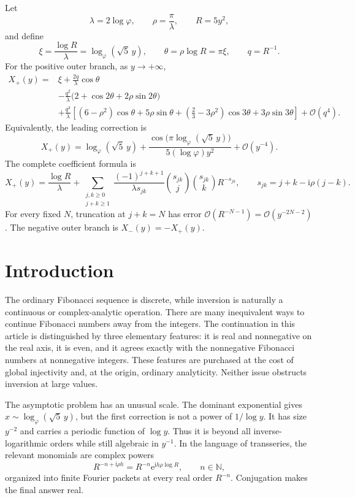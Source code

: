 \documentclass[11pt,oneside]{article}
\numberwithin{equation}{section}
\theoremstyle{plain}
\theoremstyle{definition}
\theoremstyle{remark}
\newcommand{\e}{\mathrm e}
\newcommand{\ii}{\mathrm i}
\newcommand{\Ord}{\mathcal O}
\begin{document}
\begin{mainresultbox}
Let
\[
 \lambda=2\log\varphi,\qquad \rho=\frac{\pi}{\lambda},\qquad
 R=5y^2,
\]
and define
\[
 \xi=\frac{\log R}{\lambda}=\log_{\varphi}(\sqrt5\,y),
 \qquad \theta=\rho\log R=\pi\xi,
 \qquad q=R^{-1}.
\]
For the positive outer branch, as \(y\to+\infty\),
\begin{align*}
 X_+(y)={}&\xi+\frac{2q}{\lambda}\cos\theta\\
 &-\frac{q^2}{\lambda}
   \bigl(2+\cos2\theta+2\rho\sin2\theta\bigr)\\
 &+\frac{q^3}{\lambda}
 \left[
   (6-\rho^2)\cos\theta+5\rho\sin\theta
   +\left(\frac23-3\rho^2\right)\cos3\theta
   +3\rho\sin3\theta
 \right]
 +\Ord(q^4).
\end{align*}
Equivalently, the leading correction is
\[
 X_+(y)=\log_{\varphi}(\sqrt5\,y)
 +\frac{\cos\!\bigl(\pi\log_{\varphi}(\sqrt5\,y)\bigr)}
 {5(\log\varphi)y^2}
 +\Ord(y^{-4}).
\]
The complete coefficient formula is
\[
 X_+(y)=\frac{\log R}{\lambda}
 +\sum_{\substack{j,k\ge0\\j+k\ge1}}
 \frac{(-1)^{j+k+1}}{\lambda s_{jk}}
 \binom{s_{jk}}j\binom{s_{jk}}k R^{-s_{jk}},
 \qquad s_{jk}=j+k-\ii\rho(j-k).
\]
For every fixed \(N\), truncation at \(j+k=N\) has error
\(\Ord(R^{-N-1})=\Ord(y^{-2N-2})\).  The negative outer branch is
\(X_-(y)=-X_+(y)\).
\end{mainresultbox}

\tableofcontents
\newpage
\section{Introduction}

The ordinary Fibonacci sequence is discrete, while inversion is naturally a
continuous or complex-analytic operation.  There are many inequivalent ways
to continue Fibonacci numbers away from the integers.  The continuation in
this article is distinguished by three elementary features: it is real and
nonnegative on the real axis, it is even, and it agrees exactly with the
nonnegative Fibonacci numbers at nonnegative integers.  These features are
purchased at the cost of global injectivity and, at the origin, ordinary
analyticity.  Neither issue obstructs inversion at large values.

The asymptotic problem has an unusual scale.  The dominant exponential gives
\(
 x\sim\log_{\varphi}(\sqrt5\,y)
\), but the first correction is not a power of \(1/\log y\).  It has size
\(y^{-2}\) and carries a periodic function of \(\log y\).  Thus it is beyond
all inverse-logarithmic orders while still algebraic in \(y^{-1}\).  In the
language of transseries, the relevant monomials are complex powers
\[
 R^{-n+\ii\rho h}=R^{-n}\e^{\ii h\rho\log R},
 \qquad n\in\mathbb N,
\]
organized into finite Fourier packets at every real order \(R^{-n}\).
Conjugation makes the final answer real.
\end{document}
